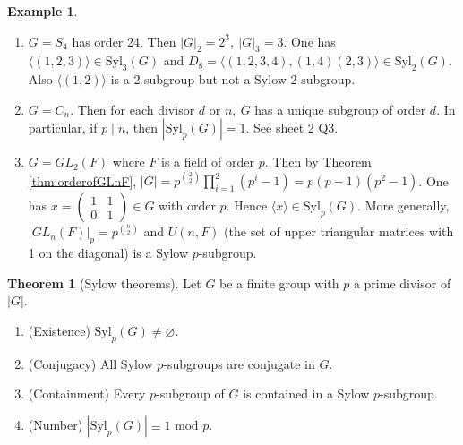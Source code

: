 \documentclass[a4paper]{article}
\newcommand{\Syl}{\text{Syl}}
\newcommand{\Mod}{\text{ mod }}
\theoremstyle{definition}
\newtheorem{thm}[defn]{Theorem}
\newtheorem{example}[defn]{Example}
\begin{document}
\begin{example}
\begin{enumerate}
\item $G=S_4$ has order 24. Then $|G|_2=2^3,\ |G|_3=3$. One has $\langle (1,2,3)\rangle\in\Syl_3(G)$ and $D_8=\langle (1,2,3,4),(1,4)(2,3)\rangle\in\Syl_2(G)$. Also $\langle(1,2)\rangle$ is a 2-subgroup but not a Sylow 2-subgroup.
\item $G=C_n$. Then for each divisor $d$ or $n,\ G$ has a unique subgroup of order $d$. In particular, if $p\mid n$, then $|\Syl_p(G)|=1$. See sheet 2 Q3.
\item $G=GL_2(F)$ where $F$ is a field of order $p$. Then by Theorem \ref{thm:orderofGLnF}, $|G|=p^{\binom{2}{2}} \prod_{i=1}^2(p^i-1)=p(p-1)(p^2-1)$. One has $x=\begin{pmatrix}1&1\\0&1\end{pmatrix}\in G$ with order $p$. Hence $\langle x\rangle \in \Syl_p(G)$. More generally, $|GL_n(F)|_p=p^{\binom{n}{2}}$ and $U(n,F)$ (the set of upper triangular matrices with 1 on the diagonal) is a Sylow $p$-subgroup.
\end{enumerate}
\end{example}

\begin{thm}[Sylow theorems]
Let $G$ be a finite group with $p$ a prime divisor of $|G|$.
\begin{enumerate}
\item (Existence) $\Syl_p(G)\neq\varnothing$.
\item (Conjugacy) All Sylow $p$-subgroups are conjugate in $G$.
\item (Containment) Every $p$-subgroup of $G$ is contained in a Sylow $p$-subgroup.
\item (Number) $|\Syl_p(G)|\equiv 1\Mod p$.
\end{enumerate}
\end{thm}
\end{document}
